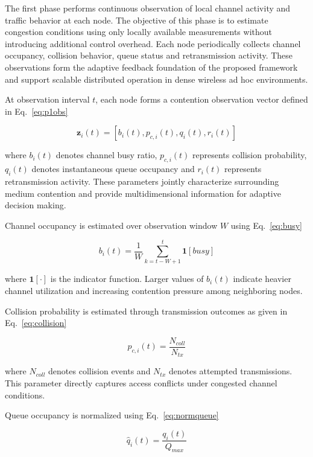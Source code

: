 \documentclass[a4paper,fleqn,final,1p]{cas-dc}
\numberwithin{equation}{section}
\begin{document}
The first phase performs continuous observation of local channel activity and traffic behavior at each node. The objective of this phase is to estimate congestion conditions using only locally available measurements without introducing additional control overhead. Each node periodically collects channel occupancy, collision behavior, queue status and retransmission activity. These observations form the adaptive feedback foundation of the proposed framework and support scalable distributed operation in dense wireless ad hoc environments.

At observation interval $t$, each node forms a contention observation vector defined in Eq.~\ref{eq:p1obs}

\begin{equation}
\mathbf z_i(t)=
[b_i(t),p_{c,i}(t),q_i(t),r_i(t)]
\label{eq:p1obs}
\end{equation}

where $b_i(t)$ denotes channel busy ratio, $p_{c,i}(t)$ represents collision probability, $q_i(t)$ denotes instantaneous queue occupancy and $r_i(t)$ represents retransmission activity. These parameters jointly characterize surrounding medium contention and provide multidimensional information for adaptive decision making.

Channel occupancy is estimated over observation window $W$ using Eq.~\ref{eq:busy}

\begin{equation}
b_i(t)=
\frac{1}{W}
\sum_{k=t-W+1}^{t}
\mathbf1[busy]
\label{eq:busy}
\end{equation}

where $\mathbf1[\cdot]$ is the indicator function. Larger values of $b_i(t)$ indicate heavier channel utilization and increasing contention pressure among neighboring nodes.

Collision probability is estimated through transmission outcomes as given in Eq.~\ref{eq:collision}

\begin{equation}
p_{c,i}(t)=
\frac{
N_{coll}
}{
N_{tx}
}
\label{eq:collision}
\end{equation}

where $N_{coll}$ denotes collision events and $N_{tx}$ denotes attempted transmissions. This parameter directly captures access conflicts under congested channel conditions.

Queue occupancy is normalized using Eq.~\ref{eq:normqueue}

\begin{equation}
\hat q_i(t)=
\frac{q_i(t)}{Q_{max}}
\label{eq:normqueue}
\end{equation}
\end{document}
